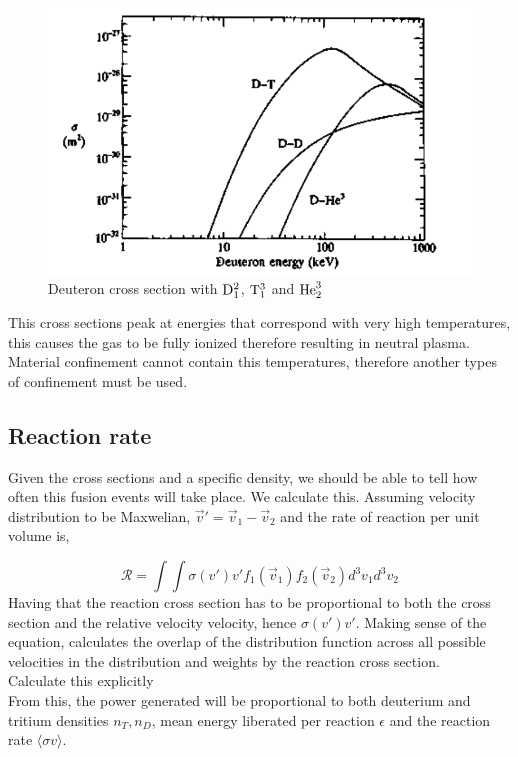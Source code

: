 \documentclass[smallextended]{svjour3}
\begin{document}
\begin{figure}
    \centering
    \includegraphics[width=0.8\linewidth]{images/DeuteronCrossSection.png}
    \caption{Deuteron cross section with $\ce{D}_1^2$, $\ce{T}_1^3$ and $\ce{He}_2^3$}
    \label{DeuteronCrossSection}
\end{figure}

This cross sections peak at energies that correspond with very high temperatures, this causes the gas to be fully ionized therefore resulting in neutral plasma. Material confinement cannot contain this temperatures, therefore another types of confinement must be used.

\subsection{Reaction rate}

Given the cross sections and a specific density, we should be able to tell how often this fusion events will take place. We calculate this. Assuming velocity distribution to be Maxwelian, $\vec{v}' = \vec{v}_1 - \vec{v}_2$ and the rate of reaction per unit volume is,

\begin{equation}
    \mathcal{R} = \int \int \sigma(v')v'f_1(\vec{v}_1)f_2(\vec{v}_2) d^3v_1d^3v_2
\end{equation}
Having that the reaction cross section has to be proportional to both the cross section and the relative velocity velocity, hence $\sigma(v') v'$.
Making sense of the equation, calculates the overlap of the distribution function across all possible velocities in the distribution and weights by the reaction cross section. \\

Calculate this explicitly \\


From this, the power generated will be proportional to both deuterium and tritium densities $n_T, n_D$, mean energy liberated per reaction $\epsilon$ and the reaction rate $\langle \sigma v\rangle$.
\end{document}
